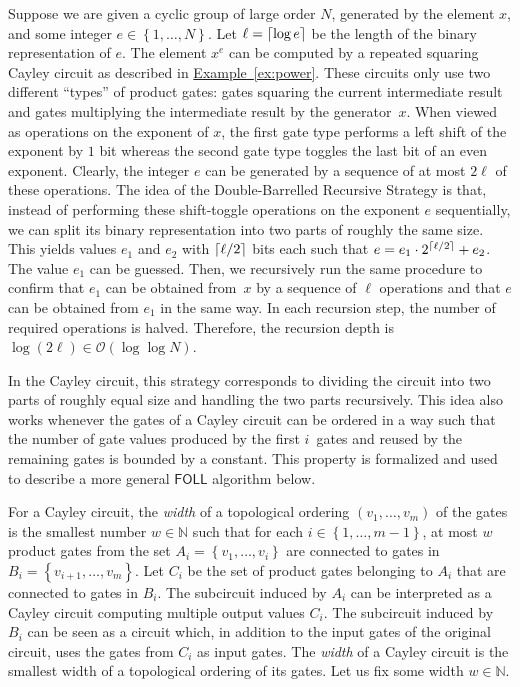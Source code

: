\documentclass[11pt]{article}
\numberwithin{equation}{section}
\theoremstyle{definition}
\theoremstyle{plain}
\newcommand{\N}{\mathbb N}
\newcommand{\expref}[2]{\hyperref[#2]{#1~\ref{#2}}}
\newcommand{\ceil}[1]{\ensuremath\left\lceil#1\right\rceil}
\newcommand{\os}[1]{\ensuremath{\left\{#1\right\}}}
\newcommand{\bigO}{\mathcal{O}}
\newcommand{\FOLL}{\ensuremath{\mathsf{FOLL}}}
\begin{document}
Suppose we are given a cyclic group of large order $N$, generated by the
element $x$, and some integer $e \in \os{1, \dots, N}$. Let 
$\ell = \ceil{\log e}$ be the length of the binary representation of $e$. 
The element $x^e$ can
be computed by a %
repeated squaring  %
Cayley circuit as described in \expref{Example}{ex:power}.
%
These circuits only use two different ``types'' of product gates: gates
squaring the current intermediate result and gates multiplying the intermediate
result by the generator~$x$. When viewed as operations on the exponent of $x$,
the first gate type performs a left shift of the exponent by $1$ bit whereas
the second gate type toggles the last bit of an even exponent. Clearly, the
integer $e$ can be generated by a sequence of at most $2\ell$ of these
operations.
%
The idea of the Double-Barrelled Recursive Strategy is that, instead of
performing these shift-toggle operations on the exponent $e$ sequentially, we
can split its binary representation into two parts of roughly the same size.
This yields values $e_1$ and $e_2$ with $\ceil{\ell/2}$ bits each such that $e
= e_1 \cdot 2^{\ceil{\ell/2}} + e_2$. The value $e_1$ can be guessed. Then, we
recursively run the same procedure to confirm that $e_1$ can be obtained
from~$x$ by a sequence of $\ell$ operations and that $e$ can be obtained from
$e_1$ in the same way.
%
In each recursion step, the number of required operations is halved. Therefore,
the recursion depth is $\log(2\ell) \in \bigO(\log \log N)$.

In the Cayley circuit, this strategy corresponds to dividing the circuit into
two parts of roughly equal size and handling the two parts recursively.
%
This idea also works whenever the gates of a Cayley circuit can be ordered in a
way such that the number of gate values produced by the first $i$~gates and
reused by the remaining gates is bounded by a constant.
%
This property is formalized and used to describe a more general $\FOLL$
algorithm below.

For a Cayley circuit, the \emph{width} of a topological ordering $(v_1, \ldots,
v_m)$ of the gates is the smallest number $w \in \N$ such that for each $i \in
\os{1, \ldots, m-1}$, at most $w$ product gates from the set $A_i = \os{v_1,
\ldots, v_i}$ are connected to gates in $B_i = \os{v_{i+1}, \ldots, v_m}$.
%
Let $C_i$ be the set of product gates belonging to $A_i$ that are connected to
gates in $B_i$.
%
The subcircuit induced by $A_i$ can be interpreted as a Cayley circuit
computing multiple output values $C_i$.
%
The subcircuit induced by $B_i$ can be seen as a circuit which, in addition to
the input gates of the original circuit, uses the gates from $C_i$ as input
gates.
%
The \emph{width} of a Cayley circuit is the smallest width of a topological
ordering of its gates. Let us fix some width $w \in \N$.
\end{document}
